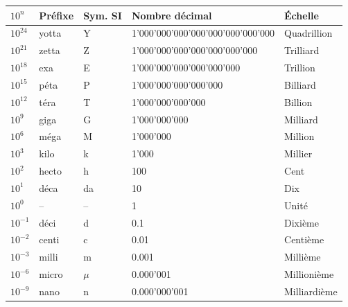 \begin{table}[htbp]
    \begin{center}
        \begin{tabular}{>{\pbs\raggedright}p{1cm}>{\pbs\raggedright}p{1.4cm}>{\pbs\centering}p{1.5cm}ll}
            $10^n$     & Préfixe & Sym. SI & Nombre décimal                    & Échelle         \\ \hline
            $10^{24}$  & yotta   & Y       & 1'000'000'000'000'000'000'000'000 & Quadrillion     \\
            $10^{21}$  & zetta   & Z       & 1'000'000'000'000'000'000'000     & Trilliard       \\
            $10^{18}$  & exa     & E       & 1'000'000'000'000'000'000         & Trillion        \\
            $10^{15}$  & péta    & P       & 1'000'000'000'000'000             & Billiard        \\
            $10^{12}$  & téra    & T       & 1'000'000'000'000                 & Billion         \\
            $10^{9}$   & giga    & G       & 1'000'000'000                     & Milliard        \\
            $10^{6}$   & méga    & M       & 1'000'000                         & Million         \\
            $10^{3}$   & kilo    & k       & 1'000                             & Millier         \\
            $10^{2}$   & hecto   & h       & 100                               & Cent            \\
            $10^{1}$   & déca    & da      & 10                                & Dix             \\
            $10^{0}$   & --      & --      & 1                                 & Unité           \\
            $10^{-1}$  & déci    & d       & 0.1                               & Dixième         \\
            $10^{-2}$  & centi   & c       & 0.01                              & Centième        \\
            $10^{-3}$  & milli   & m       & 0.001                             & Millième        \\
            $10^{-6}$  & micro   & $\mu$   & 0.000'001                         & Millionième     \\
            $10^{-9}$  & nano    & n       & 0.000'000'001                     & Milliardième    \\

\end{tabular}
\end{center}
\end{table}

